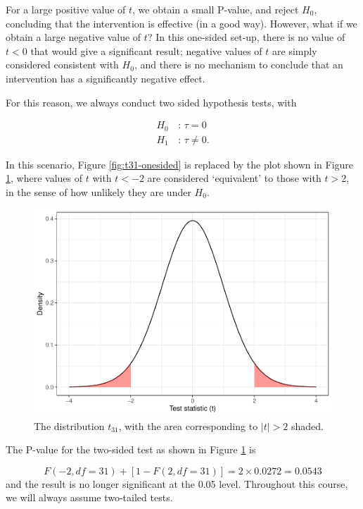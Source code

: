 \documentclass[
  openany]{book}
\theoremstyle{definition}
\theoremstyle{definition}
\theoremstyle{definition}
\theoremstyle{definition}
\theoremstyle{remark}
\begin{document}
For a large positive value of \(t\), we obtain a small P-value, and reject \(H_0\), concluding that the intervention is effective (in a good way). However, what if we obtain a large negative value of \(t\)? In this one-sided set-up, there is no value of \(t<0\) that would give a significant result; negative values of \(t\) are simply considered consistent with \(H_0\), and there is no mechanism to conclude that an intervention has a significantly negative effect.

For this reason, we always conduct two sided hypothesis tests, with

\begin{align*}
  H_0\,&:\, \tau=0\\
  H_1\,&:\, \tau\neq 0.
\end{align*}

In this scenario, Figure \ref{fig:t31-onesided} is replaced by the plot shown in Figure \ref{fig:t31-twosided}, where values of \(t\) with \(t<-2\) are considered `equivalent' to those with \(t>2\), in the sense of how unlikely they are under \(H_0\).

\begin{figure}
\centering
\includegraphics{CT4H_notes_files/figure-latex/t31-twosided-1.pdf}
\caption{\label{fig:t31-twosided}The distribution \(t_{31}\), with the area corresponding to \(|t| > 2\) shaded.}
\end{figure}

The P-value for the two-sided test as shown in Figure \ref{fig:t31-twosided} is

\[ F\left(-2, df=31\right) + \left[1 - F\left(2, df=31\right)\right] = 2\times{0.0272} = 0.0543\]
and the result is no longer significant at the 0.05 level. Throughout this course, we will always assume two-tailed tests.
\end{document}
